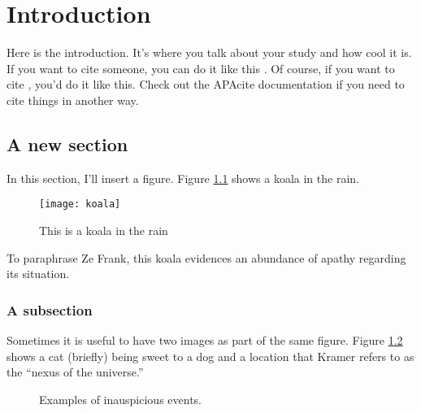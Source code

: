\chapter{Introduction}

Here is the introduction.
It's where you talk about your study and how cool it is.
If you want to cite someone, you can do it like this \cite{preston1999}.
Of course, if you want to cite , you'd do it like this.
Check out the APAcite documentation if you need to cite things in another way.

\section{A new section}

In this section, I'll insert a figure. 
Figure \ref{fig:koala} shows a koala in the rain.

\begin{figure}[b!]
\centering
\texttt{[image: koala]}
\caption{This is a koala in the rain}
\label{fig:koala}
\end{figure}

To paraphrase Ze Frank, this koala evidences an abundance of apathy regarding its situation.

\subsection{A subsection}

Sometimes it is useful to have two images as part of the same figure.
Figure \ref{fig:unlikelyEvents} shows a cat (briefly) being sweet to a dog and a location that Kramer refers to as the ``nexus of the universe.''

\begin{figure}[ht!]
\centering
{}
\caption{Examples of inauspicious events.}
\label{fig:unlikelyEvents}
\end{figure}	